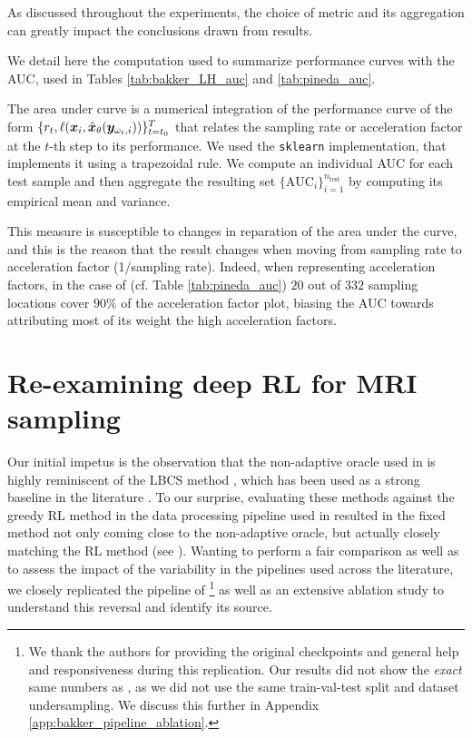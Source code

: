 As discussed throughout the experiments, the choice of metric and its aggregation can greatly impact the conclusions drawn from results.

\begin{remark} We detail here the computation used to summarize performance curves with the AUC, used in Tables \ref{tab:bakker_LH_auc} and \ref{tab:pineda_auc}. 

The area under curve is a numerical integration of the performance curve of the form $\{r_t, \ell({\bm{x}}_i, \hat{{\bm{x}}}_\theta({\bm{y}}_{\omega_t,i}))\}_{t=t_0}^T$ that relates the sampling rate or acceleration factor at the $t$-th step to its performance. We used the \texttt{sklearn} implementation, that implements it using a trapezoidal rule. We compute an individual AUC for each test sample and then aggregate the resulting set $\{\text{AUC}_i\}_{i=1}^{n_{\text{test}}}$ by computing its empirical mean and variance.

This measure is susceptible to changes in reparation of the area under the curve, and this is the reason that the result changes when moving from sampling rate to acceleration factor (1/sampling rate). Indeed, when representing acceleration factors, in the case of \citet{pineda2020active} (cf. Table \ref{tab:pineda_auc}) $20$ out of $332$ sampling locations cover $90\%$ of the acceleration factor plot, biasing the AUC towards attributing most of its weight the high acceleration factors.
\end{remark}

\section{Re-examining deep RL for MRI sampling}
\label{s:re_examining}
Our initial impetus is the observation that the non-adaptive oracle used in \cite{bakker2020experimental} is highly reminiscent of the LBCS method \cite{gozcu2018learning}, which has been used as a strong baseline in the literature \citep{jin2019self,sanchez2020uncertaintydriven}.
To our surprise, evaluating these methods against the greedy RL method in the data processing pipeline used in \citet{zhang2019reducing} resulted in the fixed method not only coming close to the non-adaptive oracle, but actually closely matching the RL method (see ).
Wanting to perform a fair comparison as well as to assess the impact of the variability in the pipelines used across the literature, we closely replicated the pipeline of \cite{bakker2020experimental}\footnote{We thank the authors for providing the original checkpoints and general help and responsiveness during this replication. Our results did not show the \textit{exact} same numbers as \citet{bakker2020experimental}, as we did not use the same train-val-test split and dataset undersampling. We discuss this further in Appendix \ref{app:bakker_pipeline_ablation}.} as well as  an extensive ablation study to understand this reversal and identify its source.


